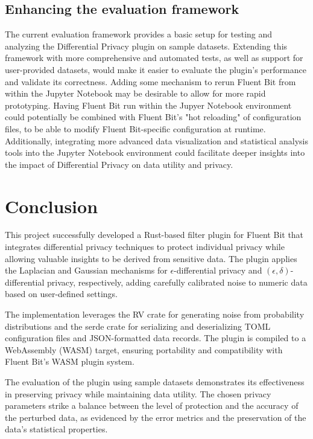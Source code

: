 \subsection{Enhancing the evaluation framework}
The current evaluation framework provides a basic setup for testing and analyzing the Differential Privacy plugin on sample datasets. Extending this framework with more comprehensive and automated tests, as well as support for user-provided datasets, would make it easier to evaluate the plugin's performance and validate its correctness. Adding some mechanism to rerun Fluent Bit from within the Jupyter Notebook may be desirable to allow for more rapid prototyping. Having Fluent Bit run within the Jupyer Notebook environment could potentially be combined with Fluent Bit's "hot reloading" of configuration files, to be able to modify Fluent Bit-specific configuration at runtime. Additionally, integrating more advanced data visualization and statistical analysis tools into the Jupyter Notebook environment could facilitate deeper insights into the impact of Differential Privacy on data utility and privacy. 

\section{Conclusion}
This project successfully developed a Rust-based filter plugin for Fluent Bit that integrates differential privacy techniques to protect individual privacy while allowing valuable insights to be derived from sensitive data. The plugin applies the Laplacian and Gaussian mechanisms for $\epsilon$-differential privacy and $(\epsilon, \delta)$-differential privacy, respectively, adding carefully calibrated noise to numeric data based on user-defined settings.

The implementation leverages the RV crate for generating noise from probability distributions and the serde crate for serializing and deserializing TOML configuration files and JSON-formatted data records. The plugin is compiled to a WebAssembly (WASM) target, ensuring portability and compatibility with Fluent Bit's WASM plugin system.

The evaluation of the plugin using sample datasets demonstrates its effectiveness in preserving privacy while maintaining data utility. The chosen privacy parameters strike a balance between the level of protection and the accuracy of the perturbed data, as evidenced by the error metrics and the preservation of the data's statistical properties.

